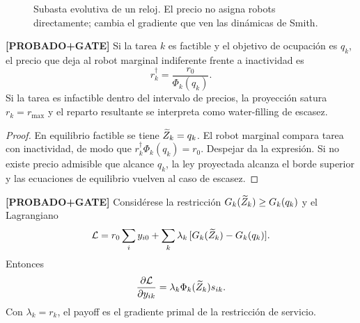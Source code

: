 \begin{figure}[H]
\centering
{}
\caption{Subasta evolutiva de un reloj. El precio no asigna robots directamente; cambia
el gradiente que ven las dinámicas de Smith.}
\label{fig:marco_subasta}
\end{figure}

\begin{teorema} \textbf{[PROBADO+GATE]}
Si la tarea $k$ es factible y el objetivo de ocupación es $q_k$, el precio que deja al
robot marginal indiferente frente a inactividad es
\[
  r_k^\dagger=\frac{r_0}{\Phi_k(q_k)}.
\]
Si la tarea es infactible dentro del intervalo de precios, la proyección satura
$r_k=r_{\max}$ y el reparto resultante se interpreta como water-filling de escasez.
\end{teorema}

\begin{proof}
En equilibrio factible se tiene $\widetilde{Z}_k=q_k$. El robot marginal compara tarea con
inactividad, de modo que $r_k^\dagger\Phi_k(q_k)=r_0$. Despejar da la expresión. Si no
existe precio admisible que alcance $q_k$, la ley proyectada alcanza el borde superior
y las ecuaciones de equilibrio vuelven al caso de escasez.
\end{proof}

\begin{proposicion} \textbf{[PROBADO+GATE]}
Considérese la restricción $G_k(\widetilde{Z}_k)\ge G_k(q_k)$ y el Lagrangiano
\[
  \mathcal{L}
  =
  r_0\sum_i y_{i0}
  +
  \sum_k\lambda_k\,[G_k(\widetilde{Z}_k)-G_k(q_k)].
\]
Entonces
\[
  \frac{\partial \mathcal{L}}{\partial y_{ik}}
  =
  \lambda_k\Phi_k(\widetilde{Z}_k)s_{ik}.
\]
Con $\lambda_k=r_k$, el payoff es el gradiente primal de la restricción de servicio.
\end{proposicion}


